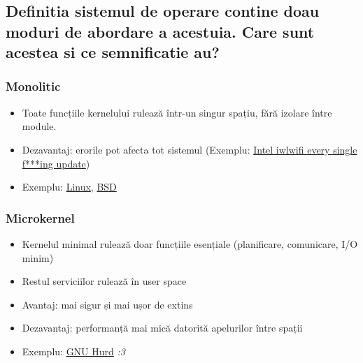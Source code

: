 \documentclass[11pt]{article}
\begin{document}
\subsection{Definitia sistemul de operare contine doau moduri de abordare a acestuia. Care sunt acestea si ce semnificatie au?}
\label{sec:org0a43368}
\subsubsection{Monolitic}
\label{sec:org6f211f3}
\begin{itemize}
\item Toate funcțiile kernelului rulează într-un singur spațiu, fără izolare între module.
\item Dezavantaj: erorile pot afecta tot sistemul (Exemplu: \href{https://bugzilla.kernel.org/buglist.cgi?bug\_status=NEW\&bug\_status=ASSIGNED\&bug\_status=REOPENED\&bug\_status=RESOLVED\&bug\_status=VERIFIED\&bug\_status=REJECTED\&bug\_status=DEFERRED\&bug\_status=NEEDINFO\&bug\_status=CLOSED\&component=network-wireless-intel\&order=Importance\&query\_format=advanced\&short\_desc=iwlwifi\&short\_desc\_type=casesubstring}{Intel iwlwifi every single f***ing update})
\item Exemplu: \href{https://kernel.org}{Linux}, \href{https://en.wikipedia.org/wiki/Berkeley\_Software\_Distribution}{BSD}
\end{itemize}
\subsubsection{Microkernel}
\label{sec:org1466a65}
\begin{itemize}
\item Kernelul minimal rulează doar funcțiile esențiale (planificare, comunicare, I/O minim)
\item Restul serviciilor rulează în user space
\item Avantaj: mai sigur și mai ușor de extins
\item Dezavantaj: performanță mai mică datorită apelurilor între spații
\item Exemplu: \href{https://www.gnu.org/software/hurd}{GNU Hurd} \emph{:3}
\end{itemize}
\end{document}
